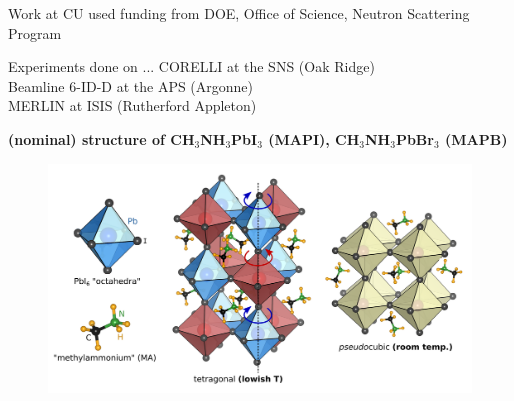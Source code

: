 \documentclass[12pt]{beamer}
\begin{document}
{\begin{frame}
\vspace{-0.5cm}
\centering
Work at CU used funding from DOE, Office of Science, Neutron Scattering Program

\vspace{0.5cm}
\begin{block}{Experiments done on ...}
CORELLI at the SNS (Oak Ridge) \\
Beamline 6-ID-D at the APS (Argonne) \\
MERLIN at ISIS (Rutherford Appleton)
\end{block}
\end{frame}

}


\begin{frame} %

\textbf{(nominal) structure of CH$_3$NH$_3$PbI$_3$ (MAPI), CH$_3$NH$_3$PbBr$_3$ (MAPB)}

\vspace{0.5cm}
\begin{figure}
    \includegraphics[width=1.0\linewidth]{figs/struct.png}
\end{figure}
\end{frame}

\end{document}
